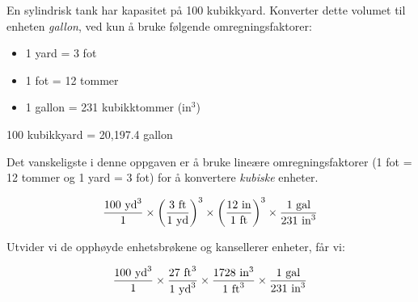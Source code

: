 
En sylindrisk tank har kapasitet på 100 kubikkyard. Konverter dette volumet til enheten {\it gallon}, ved kun å bruke følgende omregningsfaktorer:

\begin{itemize}
\item{} 1 yard = 3 fot
\item{} 1 fot = 12 tommer
\item{} 1 gallon = 231 kubikktommer (in$^{3}$)
\end{itemize}







100 kubikkyard = 20,197.4 gallon

\vskip 10pt

Det vanskeligste i denne oppgaven er å bruke lineære omregningsfaktorer (1 fot = 12 tommer og 1 yard = 3 fot) for å konvertere {\it kubiske} enheter.

$${100 \hbox{ yd}^3 \over 1} \times \left({3 \hbox{ ft} \over 1 \hbox{ yd}}\right)^3 \times \left({12 \hbox{ in} \over 1 \hbox{ ft}}\right)^3 \times {1 \hbox{ gal} \over 231 \hbox{ in}^3}$$

Utvider vi de opphøyde enhetsbrøkene og kansellerer enheter, får vi:

$${100 \hbox{ yd}^3 \over 1} \times {27 \hbox{ ft}^3 \over 1 \hbox{ yd}^3} \times {1728 \hbox{ in}^3 \over 1 \hbox{ ft}^3} \times {1 \hbox{ gal} \over 231 \hbox{ in}^3}$$









